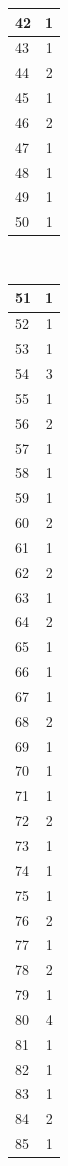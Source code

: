 \documentclass[10pt,twoside]{article}
\theoremstyle{definition}
\begin{document}
\begin{table}
\begin{center}
\begin{tabular}{|l|c|}
42 & 1 \\\hline
43 & 1 \\\hline
44 & 2 \\\hline
45 & 1 \\\hline
46 & 2 \\\hline
47 & 1 \\\hline
48 & 1 \\\hline
49 & 1 \\\hline
50 & 1 \\\hline
\end{tabular}
\,\,\,\,\,\,
\begin{tabular}{|l|c|}\hline
51 & 1 \\\hline
52 & 1 \\\hline
53 & 1 \\\hline
54 & 3 \\\hline
55 & 1 \\\hline
56 & 2 \\\hline
57 & 1 \\\hline
58 & 1 \\\hline
59 & 1 \\\hline
60 & 2 \\\hline
61 & 1 \\\hline
62 & 2 \\\hline
63 & 1 \\\hline
64 & 2 \\\hline
65 & 1 \\\hline
66 & 1 \\\hline
67 & 1 \\\hline
68 & 2 \\\hline
69 & 1 \\\hline
70 & 1 \\\hline
71 & 1 \\\hline
72 & 2 \\\hline
73 & 1 \\\hline
74 & 1 \\\hline
75 & 1 \\\hline
76 & 2 \\\hline
77 & 1 \\\hline
78 & 2 \\\hline
79 & 1 \\\hline
80 & 4 \\\hline
81 & 1 \\\hline
82 & 1 \\\hline
83 & 1 \\\hline
84 & 2 \\\hline
85 & 1 \\\hline

\end{tabular}
\end{center}
\end{table}
\end{document}
